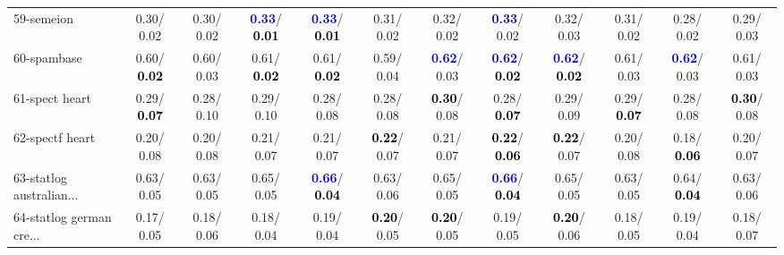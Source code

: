 \begin{table}[h]
\begin{center}
{\begin{tabular}{lc|c|c|c|c|c|c|c|c|c|c}
59-semeion &   0.30/  0.02 &   0.30/  0.02 & \textcolor{blue}{\textbf{  0.33}}/\textcolor{black}{\textbf{  0.01}} & \textcolor{blue}{\textbf{  0.33}}/\textcolor{black}{\textbf{  0.01}} &   0.31/  0.02 &   0.32/  0.02 & \textcolor{blue}{\textbf{  0.33}}/  0.02 &   0.32/  0.03 &   0.31/  0.02 &   0.28/  0.02 &   0.29/  0.03 \\
60-spambase &   0.60/\textcolor{black}{\textbf{  0.02}} &   0.60/  0.03 &   0.61/\textcolor{black}{\textbf{  0.02}} &   0.61/\textcolor{black}{\textbf{  0.02}} &   0.59/  0.04 & \textcolor{blue}{\textbf{  0.62}}/  0.03 & \textcolor{blue}{\textbf{  0.62}}/\textcolor{black}{\textbf{  0.02}} & \textcolor{blue}{\textbf{  0.62}}/\textcolor{black}{\textbf{  0.02}} &   0.61/  0.03 & \textcolor{blue}{\textbf{  0.62}}/  0.03 &   0.61/  0.03 \\ \hline
61-spect heart &   0.29/\textcolor{black}{\textbf{  0.07}} &   0.28/  0.10 &   0.29/  0.10 &   0.28/  0.08 &   0.28/  0.08 & \textcolor{black}{\textbf{  0.30}}/  0.08 &   0.28/\textcolor{black}{\textbf{  0.07}} &   0.29/  0.09 &   0.29/\textcolor{black}{\textbf{  0.07}} &   0.28/  0.08 & \textcolor{black}{\textbf{  0.30}}/  0.08 \\
62-spectf heart &   0.20/  0.08 &   0.20/  0.08 &   0.21/  0.07 &   0.21/  0.07 & \textcolor{black}{\textbf{  0.22}}/  0.07 &   0.21/  0.07 & \textcolor{black}{\textbf{  0.22}}/\textcolor{black}{\textbf{  0.06}} & \textcolor{black}{\textbf{  0.22}}/  0.07 &   0.20/  0.08 &   0.18/\textcolor{black}{\textbf{  0.06}} &   0.20/  0.07 \\
63-statlog australian... &   0.63/  0.05 &   0.63/  0.05 &   0.65/  0.05 & \textcolor{blue}{\textbf{  0.66}}/\textcolor{black}{\textbf{  0.04}} &   0.63/  0.06 &   0.65/  0.05 & \textcolor{blue}{\textbf{  0.66}}/\textcolor{black}{\textbf{  0.04}} &   0.65/  0.05 &   0.63/  0.05 &   0.64/\textcolor{black}{\textbf{  0.04}} &   0.63/  0.06 \\
64-statlog german cre... &   0.17/  0.05 &   0.18/  0.06 &   0.18/  0.04 &   0.19/  0.04 & \textcolor{black}{\textbf{  0.20}}/  0.05 & \textcolor{black}{\textbf{  0.20}}/  0.05 &   0.19/  0.05 & \textcolor{black}{\textbf{  0.20}}/  0.06 &   0.18/  0.05 &   0.19/  0.04 &   0.18/  0.07 \\\end{tabular}
}\label{strats1aC4.5w}
\end{center}
\end{table}
